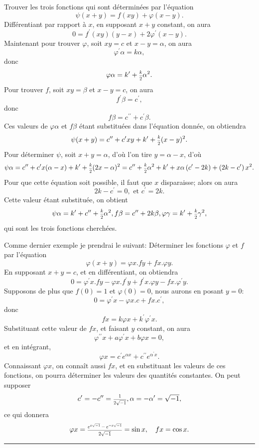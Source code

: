 \documentclass[oneside, 12 pt, leqno]{memoir}
\let\oldfrac\frac
\def\frac#1#2{\mathchoice{\text{\scalebox{.83}{${\oldfrac{#1}{#2}}$}}}{\text{\scalebox{.83}{${\displaystyle\oldfrac{#1}{#2}}$}}}{\genfrac{}{}{}{2}{#1}{#2}}{\genfrac{}{}{}{3}{#1}{#2}}}
\begin{document}
Trouver les trois fonctions qui sont déterminées par l'équation
\[\psi(x+y)=f(x y)+\varphi(x-y). \]
Différentiant par rapport à \(x\), en supposant \(x+y\) constant, on aura
\[0=f^{\prime}(x y)(y-x)+2 \varphi^{\prime}(x-y).\]
Maintenant pour trouver \(\varphi\), soit \(x y=c\) et \(x-y=\alpha\), on aura
\[\varphi^{\prime} \alpha=k \alpha,\]
donc
\[\varphi \alpha=k^{\prime}+\frac{k}{2} \alpha^2.\]
Pour trouver \(f\), soit \(x y=\beta\) et \(x-y=c\), on aura
\[f^{\prime} \beta=c^{\prime},\]
donc
\[f \beta=c^{\prime \prime}+c^{\prime} \beta.\]
Ces valeurs de \(\varphi \alpha\) et \(f \beta\) étant substituées dans l'équation donnée, on obtiendra
\[\psi(x+y)=c^{\prime \prime}+c^{\prime} x y+k^{\prime}+\frac{k}{2}(x-y)^2.\]
Pour déterminer \(\psi\), soit \(x+y=\alpha\), d'où l'on tire \(y=\alpha-x\), d'où
\[\psi \alpha=c^{\prime \prime}+c^{\prime} x(\alpha-x)+k^{\prime}+\frac{k}{2}(2 x-\alpha)^2=c^{\prime \prime}+\frac{k}{2} \alpha^2+k^{\prime}+x \alpha\left(c^{\prime}-2 k\right)+\left(2 k-c^{\prime}\right) x^2.\]
Pour que cette équation soit possible, il faut que \(x\) disparaisse; alors on aura
\[2 k-c^{\prime}=0, \text { et } c^{\prime}=2 k.\]
Cette valeur étant substituée, on obtient
\[
\psi \alpha=k^{\prime}+c^{\prime \prime}+\frac{k}{2} \alpha^2, f \beta=c^{\prime \prime}+2 k \beta, \varphi \gamma=k^{\prime}+\frac{k}{2} \gamma^2,
\]
qui sont les trois fonctions cherchées. \clearpage\noindent%

Comme dernier exemple je prendrai le suivant: Déterminer les fonctions \(\varphi\) et \(f\) par l'équation
\[\varphi(x+y)=\varphi x. f y+f x. \varphi y.\]
En supposant \(x+y=c\), et en différentiant, on obtiendra
\[0=\varphi^{\prime} x. f y-\varphi x. f^{\prime} y+f^{\prime} x. \varphi y-f x. \varphi^{\prime} y.\]
Supposons de plus que \(f(0)=1\) et \(\varphi(0)=0\), nous aurons en posant \(y=0\):
\[0=\varphi^{\prime} x-\varphi x. c+f x. c^{\prime},\]
donc
\[f x= k \varphi x+k^{\prime} \varphi^{\prime} x.\]
Substituant cette valeur de \(f x\), et faisant \(y\) constant, on aura
\[\varphi^{\prime \prime} x+a \varphi^{\prime} x+b \varphi x=0,\]
et en intégrant,
\[\varphi x=c^{\prime} e^{\alpha x}+c^{\prime \prime} e^{\alpha^{\prime} x}.\]
Connaissant \(\varphi x\), on connaît aussi \(f x\), et en substituant les valeurs de ces fonctions, on pourra déterminer les valeurs des quantités constantes. On peut supposer
\[c^{\prime}=-c^{\prime \prime}=\frac{1}{2 \sqrt{-1}}, \alpha=-\alpha^{\prime}=\sqrt{-1},\]
ce qui donnera
\[\varphi x=\frac{e^{x \sqrt{-1}}-e^{-x \sqrt{-1}}}{2 \sqrt{-1}}=\sin x, \quad f x=\cos x.\]
\begin{center}
\rule{2in}{0.1pt}
\end{center}
\end{document}
